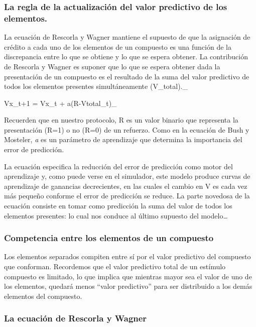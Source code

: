 \documentclass[
  letterpaper,
]{book}
\begin{document}
\subsubsection{La regla de la actualización del valor predictivo de los
elementos.}\label{la-regla-de-la-actualizaciuxf3n-del-valor-predictivo-de-los-elementos.}

La ecuación de Rescorla y Wagner mantiene el supuesto de que la
asignación de crédito a cada uno de los elementos de un compuesto es una
función de la discrepancia entre lo que se obtiene y lo que se espera
obtener. La contribución de Rescorla y Wagner es suponer que lo que se
espera obtener dada la presentación de un compuesto es el resultado de
la suma del valor predictivo de todos los elementos presentes
simultáneamente (V\_total).\_

Vx\_t+1 = Vx\_t + a(R-Vtotal\_t)\_

Recuerden que en nuestro protocolo, R es un valor binario que representa
la presentación (R=1) o no (R=0) de un refuerzo. Como en la ecuación de
Bush y Mosteler, \emph{a} es un parámetro de aprendizaje que determina
la importancia del error de predicción.

La ecuación especifica la reducción del error de predicción como motor
del aprendizaje y, como puede verse en el simulador, este modelo produce
curvas de aprendizaje de ganancias decrecientes, en las cuales el cambio
en V es cada vez más pequeño conforme el error de predicción se reduce.
La parte novedosa de la ecuación consiste en tomar como predicción la
suma del valor de todos los elementos presentes: lo cual nos conduce al
último supuesto del modelo\ldots{}

\subsubsection{Competencia entre los elementos de un
compuesto}\label{competencia-entre-los-elementos-de-un-compuesto}

Los elementos separados compiten entre sí por el valor predictivo del
compuesto que conforman. Recordemos que el valor predictivo total de un
estímulo compuesto es limitado, lo que implica que mientras mayor sea el
valor de uno de los elementos, quedará menos ``valor predictivo'' para
ser distribuido a los demás elementos del compuesto.

\subsubsection{La ecuación de Rescorla y
Wagner}\label{la-ecuaciuxf3n-de-rescorla-y-wagner}
\end{document}
